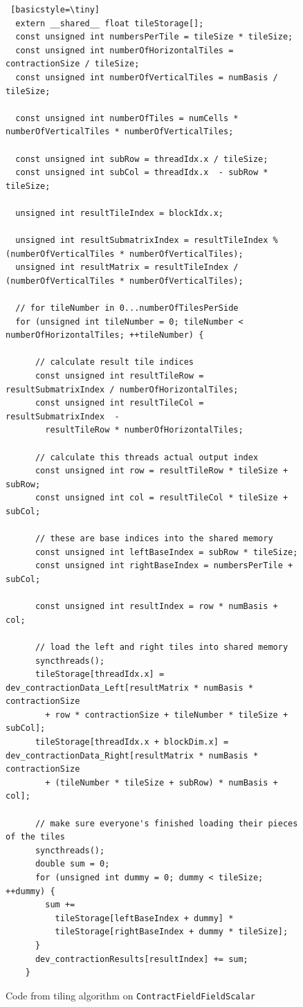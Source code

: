 \begin{figure}
    \begin{lstlisting} [basicstyle=\tiny]
  extern __shared__ float tileStorage[];
  const unsigned int numbersPerTile = tileSize * tileSize;
  const unsigned int numberOfHorizontalTiles = contractionSize / tileSize;
  const unsigned int numberOfVerticalTiles = numBasis / tileSize;

  const unsigned int numberOfTiles = numCells * numberOfVerticalTiles * numberOfVerticalTiles;

  const unsigned int subRow = threadIdx.x / tileSize;
  const unsigned int subCol = threadIdx.x  - subRow * tileSize;

  unsigned int resultTileIndex = blockIdx.x;

  unsigned int resultSubmatrixIndex = resultTileIndex % (numberOfVerticalTiles * numberOfVerticalTiles);
  unsigned int resultMatrix = resultTileIndex / (numberOfVerticalTiles * numberOfVerticalTiles);

  // for tileNumber in 0...numberOfTilesPerSide
  for (unsigned int tileNumber = 0; tileNumber < numberOfHorizontalTiles; ++tileNumber) {
      
      // calculate result tile indices
      const unsigned int resultTileRow = resultSubmatrixIndex / numberOfHorizontalTiles;
      const unsigned int resultTileCol = resultSubmatrixIndex  -
        resultTileRow * numberOfHorizontalTiles;

      // calculate this threads actual output index
      const unsigned int row = resultTileRow * tileSize + subRow;
      const unsigned int col = resultTileCol * tileSize + subCol;

      // these are base indices into the shared memory
      const unsigned int leftBaseIndex = subRow * tileSize;
      const unsigned int rightBaseIndex = numbersPerTile + subCol;

      const unsigned int resultIndex = row * numBasis + col;

      // load the left and right tiles into shared memory
      syncthreads();
      tileStorage[threadIdx.x] = dev_contractionData_Left[resultMatrix * numBasis * contractionSize
        + row * contractionSize + tileNumber * tileSize + subCol];
      tileStorage[threadIdx.x + blockDim.x] = dev_contractionData_Right[resultMatrix * numBasis * contractionSize
        + (tileNumber * tileSize + subRow) * numBasis + col];
      
      // make sure everyone's finished loading their pieces of the tiles
      syncthreads();
      double sum = 0;
      for (unsigned int dummy = 0; dummy < tileSize; ++dummy) {
        sum +=
          tileStorage[leftBaseIndex + dummy] *
          tileStorage[rightBaseIndex + dummy * tileSize];
      }
      dev_contractionResults[resultIndex] += sum;
    }

 \end{lstlisting}
\caption{Code from tiling algorithm on \texttt{ContractFieldFieldScalar}
\label{lst:ContractFieldFieldScalarTiling}} 
\end{figure}


